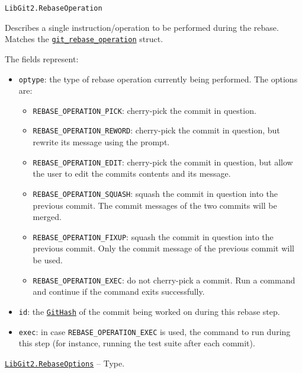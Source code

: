 \begin{adjustwidth}{2em}{0pt}


\begin{verbatim}
LibGit2.RebaseOperation
\end{verbatim}

Describes a single instruction/operation to be performed during the rebase. Matches the \href{https://libgit2.org/libgit2/\#HEAD/type/git\_rebase\_operation\_t}{\texttt{git\_rebase\_operation}} struct.

The fields represent:

\begin{itemize}
\item \texttt{optype}: the type of rebase operation currently being performed. The options are:

\begin{itemize}
\item \texttt{REBASE\_OPERATION\_PICK}: cherry-pick the commit in question.


\item \texttt{REBASE\_OPERATION\_REWORD}: cherry-pick the commit in question, but rewrite its message using the prompt.


\item \texttt{REBASE\_OPERATION\_EDIT}: cherry-pick the commit in question, but allow the user to edit the commit{\textquotesingle}s contents and its message.


\item \texttt{REBASE\_OPERATION\_SQUASH}: squash the commit in question into the previous commit. The commit messages of the two commits will be merged.


\item \texttt{REBASE\_OPERATION\_FIXUP}: squash the commit in question into the previous commit. Only the commit message of the previous commit will be used.


\item \texttt{REBASE\_OPERATION\_EXEC}: do not cherry-pick a commit. Run a command and continue if the command exits successfully.

\end{itemize}

\item \texttt{id}: the \hyperlink{202290709580230708}{\texttt{GitHash}} of the commit being worked on during this rebase step.


\item \texttt{exec}: in case \texttt{REBASE\_OPERATION\_EXEC} is used, the command to run during this step (for instance, running the test suite after each commit).

\end{itemize}


\end{adjustwidth}
\hypertarget{9347726754162781322}{} 
\hyperlink{9347726754162781322}{\texttt{LibGit2.RebaseOptions}}  -- {Type.}

